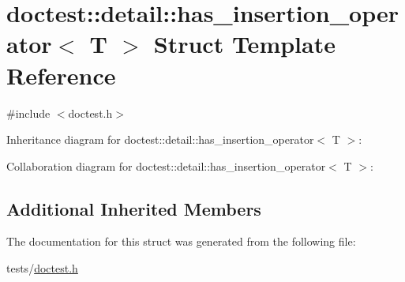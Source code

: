 \hypertarget{structdoctest_1_1detail_1_1has__insertion__operator}{}\section{doctest\+:\+:detail\+:\+:has\+\_\+insertion\+\_\+operator$<$ T $>$ Struct Template Reference}
\label{structdoctest_1_1detail_1_1has__insertion__operator}


{\ttfamily \#include $<$doctest.\+h$>$}



Inheritance diagram for doctest\+:\+:detail\+:\+:has\+\_\+insertion\+\_\+operator$<$ T $>$\+:


Collaboration diagram for doctest\+:\+:detail\+:\+:has\+\_\+insertion\+\_\+operator$<$ T $>$\+:
\subsection*{Additional Inherited Members}


The documentation for this struct was generated from the following file\+:\begin{DoxyCompactItemize}
\item 
tests/\hyperlink{doctest_8h}{doctest.\+h}\end{DoxyCompactItemize}
